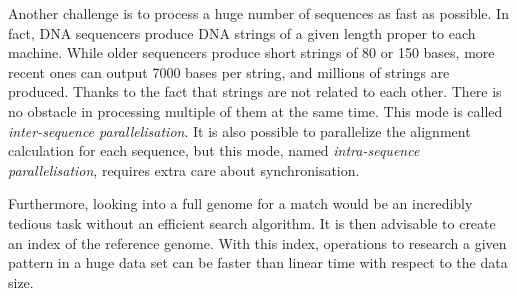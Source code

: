 Another challenge is to process a huge number of sequences as fast as possible. In fact, DNA sequencers produce DNA strings of a given length proper to each machine. While older sequencers produce short strings of 80 or 150 bases, more recent ones can output 7000 bases per string, and millions of strings are produced. Thanks to the fact that strings are not related to each other. There is no obstacle in processing multiple of them at the same time. This mode is called \emph{inter-sequence parallelisation}. It is also possible to parallelize the alignment calculation for each sequence, but this mode, named \emph{intra-sequence parallelisation}, requires extra care about synchronisation.

Furthermore, looking into a full genome for a match would be an incredibly tedious task without an efficient search algorithm. It is then advisable to create an index of the reference genome. With this index, operations to research a given pattern in a huge data set can be faster than linear time with respect to the data size.

